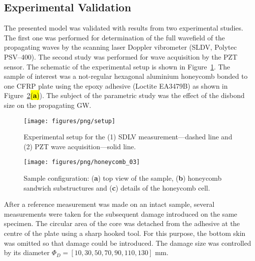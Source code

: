 \documentclass[sensors,article,accept,moreauthors,pdftex]{Definitions/mdpi}
\begin{document}
\begin{paracol}{2}
\section{Experimental Validation}
The presented model was validated with results from two experimental studies.
The first one was performed for determination of the full wavefield of the propagating waves by the scanning laser Doppler vibrometer (SLDV, Polytec PSV–400).
The second study was performed for wave acquisition by the PZT sensor.
The schematic of the experimental setup is shown in Figure~\ref{fig:setup}.
The sample of interest was a not-regular hexagonal aluminium honeycomb bonded to one CFRP plate  using the epoxy adhesive (Loctite EA3479B) as shown in Figure~\ref{fig:honeycomb}\hl{(\textbf{a})}).%
The subject of the parametric study was the effect of the disbond size on the propagating GW.

\vspace{-6pt}
\begin{figure}[H]
		\texttt{[image: figures/png/setup]}
	\caption{Experimental setup for the (1) SDLV measurement---dashed line and (2) PZT wave acquisition---solid line.}
	\label{fig:setup}
\end{figure}
\vspace{-12pt}
\begin{figure}[H]
		\texttt{[image: figures/png/honeycomb\_03]}
	\caption{Sample configuration: (\textbf{a}) top view of the sample, (\textbf{b}) honeycomb sandwich substructures and (\textbf{c}) details of the honeycomb cell.}
	\label{fig:honeycomb}
\end{figure}


After a reference measurement was made on an intact sample, several measurements were taken for the subsequent damage introduced on the same specimen.
The circular area of the core was detached from the adhesive at the centre of the plate using a sharp hooked tool.
For this purpose, the bottom skin was omitted so that damage could be introduced.
The damage size was controlled by its diameter \(\Phi_D=\left [10, 30, 50, 70, 90, 110, 130 \right ]\) mm.


\end{paracol}
\end{document}

